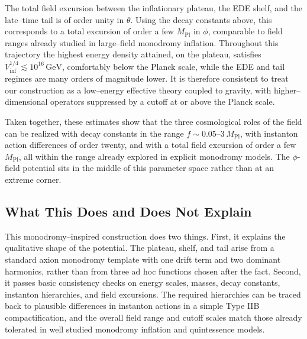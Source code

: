 \documentclass[a4paper,11pt]{article}
\begin{document}
The total field excursion between the inflationary plateau, the EDE shelf, and the late–time tail is of order unity in $\theta$. Using the decay constants above, this corresponds to a total excursion of order a few $M_{\text{Pl}}$ in $\phi$, comparable to field ranges already studied in large–field monodromy inflation. Throughout this trajectory the highest energy density attained, on the plateau, satisfies $V_{\text{inf}}^{1/4} \lesssim 10^{16}\,\text{GeV}$, comfortably below the Planck scale, while the EDE and tail regimes are many orders of magnitude lower. It is therefore consistent to treat our construction as a low–energy effective theory coupled to gravity, with higher–dimensional operators suppressed by a cutoff at or above the Planck scale.

Taken together, these estimates show that the three cosmological roles of the field can be realized with decay constants in the range $f \sim 0.05\text{--}3\,M_{\text{Pl}}$, with instanton action differences of order twenty, and with a total field excursion of order a few $M_{\text{Pl}}$, all within the range already explored in explicit monodromy models. The $\phi$-field potential sits in the middle of this parameter space rather than at an extreme corner.


\subsection{What This Does and Does Not Explain}
\label{sec:monodromy_limits}

This monodromy–inspired construction does two things. First, it explains the qualitative shape of the potential. The plateau, shelf, and tail arise from a standard axion monodromy template with one drift term and two dominant harmonics, rather than from three ad hoc functions chosen after the fact. Second, it passes basic consistency checks on energy scales, masses, decay constants, instanton hierarchies, and field excursions. The required hierarchies can be traced back to plausible differences in instanton actions in a simple Type IIB compactification, and the overall field range and cutoff scales match those already tolerated in well studied monodromy inflation and quintessence models.
\end{document}
